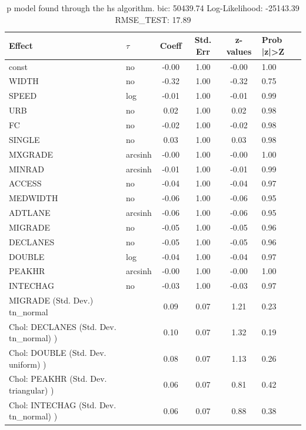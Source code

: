 \begin{table}
	\caption{p model found through the hs algorithm. bic: 50439.74 Log-Likelihood: -25143.39 RMSE_TEST: 17.89}
	\begin{center}
		\begin{tabular}{|l|l|c|c|c|l|}
			\hline
			Effect & $\tau$ & Coeff & Std. Err & z-values & Prob |z|>Z \\
			\hline
			const & no & -0.00 & 1.00 & -0.00 & 1.00 \\
			\hline
			WIDTH & no & -0.32 & 1.00 & -0.32 & 0.75 \\
			\hline
			SPEED & log & -0.01 & 1.00 & -0.01 & 0.99 \\
			\hline
			URB & no & 0.02 & 1.00 & 0.02 & 0.98 \\
			\hline
			FC & no & -0.02 & 1.00 & -0.02 & 0.98 \\
			\hline
			SINGLE & no & 0.03 & 1.00 & 0.03 & 0.98 \\
			\hline
			MXGRADE & arcsinh & -0.00 & 1.00 & -0.00 & 1.00 \\
			\hline
			MINRAD & arcsinh & -0.01 & 1.00 & -0.01 & 0.99 \\
			\hline
			ACCESS & no & -0.04 & 1.00 & -0.04 & 0.97 \\
			\hline
			MEDWIDTH & no & -0.06 & 1.00 & -0.06 & 0.95 \\
			\hline
			ADTLANE & arcsinh & -0.06 & 1.00 & -0.06 & 0.95 \\
			\hline
			MIGRADE & no & -0.05 & 1.00 & -0.05 & 0.96 \\
			\hline
			DECLANES & no & -0.05 & 1.00 & -0.05 & 0.96 \\
			\hline
			DOUBLE & log & -0.04 & 1.00 & -0.04 & 0.97 \\
			\hline
			PEAKHR & arcsinh & -0.00 & 1.00 & -0.00 & 1.00 \\
			\hline
			INTECHAG & no & -0.03 & 1.00 & -0.03 & 0.97 \\
			\hline
			MIGRADE (Std. Dev.) tn_normal &  & 0.09 & 0.07 & 1.21 & 0.23 \\
			\hline
			 Chol: DECLANES (Std. Dev. tn_normal) ) &  & 0.10 & 0.07 & 1.32 & 0.19 \\
			\hline
			 Chol: DOUBLE (Std. Dev. uniform) ) &  & 0.08 & 0.07 & 1.13 & 0.26 \\
			\hline
			 Chol: PEAKHR (Std. Dev. triangular) ) &  & 0.06 & 0.07 & 0.81 & 0.42 \\
			\hline
			 Chol: INTECHAG (Std. Dev. tn_normal) ) &  & 0.06 & 0.07 & 0.88 & 0.38 \\

\end{tabular}
\end{center}
\end{table}

